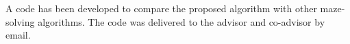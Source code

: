 A code has been developed to compare the proposed algorithm with other maze-solving algorithms. The code was delivered to the advisor and co-advisor by email.